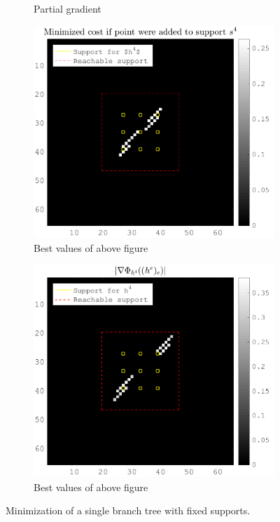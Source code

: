\begin{figure}[!h]
\begin{subfigure}[b]{0.49\textwidth}
\caption{Partial gradient}
\end{subfigure}
\begin{subfigure}[b]{0.49\textwidth}\centering
\includegraphics[width=\textwidth]{figures/xp/xp_128x128_sc2_angl1_K3_S3_node4_objmatrix_bestvalues.png}
\caption{Best values of above figure}
\end{subfigure}
\begin{subfigure}[b]{0.49\textwidth}\centering
\includegraphics[width=\textwidth]{figures/xp/xp_128x128_sc2_angl1_K3_S3_node4_partgrad4_bestvalues.png}
\caption{Best values of above figure}
\end{subfigure}
\caption{Minimization of a single branch tree with fixed supports. }
\end{figure}

